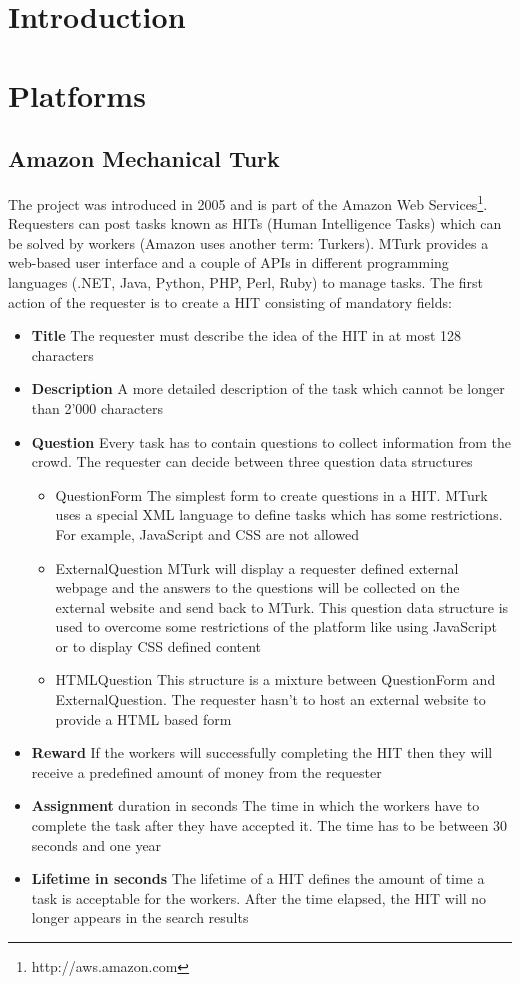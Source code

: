 \section{Introduction}

\section{Platforms}
\subsection{Amazon Mechanical Turk}
The project was introduced in 2005 and is part of the Amazon Web Services\footnote{http://aws.amazon.com}. Requesters can post tasks known as HITs (Human Intelligence Tasks) which can be solved by workers (Amazon uses another term: Turkers). MTurk provides a web-based user interface and a couple of APIs in different programming languages (.NET, Java, Python, PHP, Perl, Ruby) to manage tasks. The first action of the requester is to create a HIT consisting of mandatory fields: 
\begin{itemize}
	\item \textbf{Title} The requester must describe the idea of the HIT in at most 128 characters 
	\item \textbf{Description} A more detailed description of the task which cannot be longer than 2'000 characters 
	\item \textbf{Question} Every task has to contain questions to collect information from the crowd. The requester can decide between three question data structures 
	\begin{itemize}
		\item QuestionForm The simplest form to create questions in a HIT. MTurk uses a special XML language to define tasks which has some restrictions. For example, JavaScript and CSS are not allowed 
		\item ExternalQuestion MTurk will display a requester defined external webpage and the answers to the questions will be collected on the external website and send back to MTurk. This question data structure is used to overcome some restrictions of the platform like using JavaScript or to display CSS defined content 
		\item HTMLQuestion This structure is a mixture between QuestionForm and ExternalQuestion. The requester hasn't to host an external website to provide a HTML based form 
	\end{itemize}
	\item \textbf{Reward} If the workers will successfully completing the HIT then they will receive a predefined amount of money from the requester 
	\item \textbf{Assignment} duration in seconds The time in which the workers have to complete the task after they have accepted it. The time has to be between 30 seconds and one year 
	\item \textbf{Lifetime in seconds} The lifetime of a HIT defines the amount of time a task is acceptable for the workers. After the time elapsed, the HIT will no longer appears in the search results 
\end{itemize}
